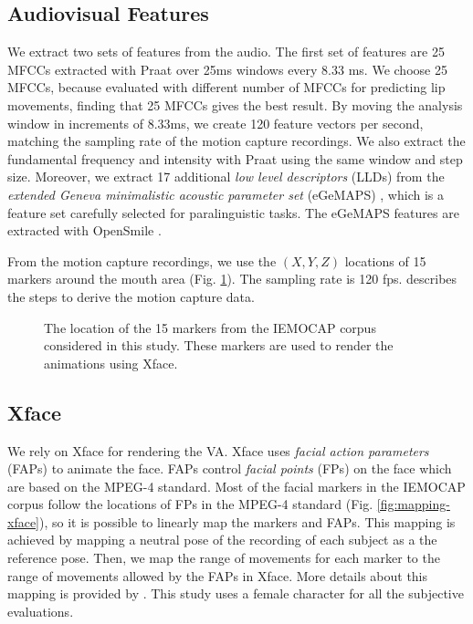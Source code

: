 \documentclass[10pt,journal,compsoc]{IEEEtran}
\begin{document}
\subsection{Audiovisual Features}
\label{ssec:features}

We extract two sets of features from the audio. The first set of features are 25 MFCCs extracted with Praat \cite{Boersma_1996} over 25ms windows every 8.33 ms. We choose 25 MFCCs, because  \citet{Taylor_2016} evaluated with different number of MFCCs for predicting lip movements, finding that 25 MFCCs gives the best result. By moving the analysis window in increments of 8.33ms, we create 120 feature vectors per second, matching the sampling rate of the motion capture recordings. We also extract the fundamental frequency and intensity with Praat using the same window and step size. Moreover, we extract 17 additional \emph{low level descriptors} (LLDs) from the \emph{extended Geneva minimalistic acoustic parameter set} (eGeMAPS) \cite{Eyben_2016}, which is a feature set carefully selected for paralinguistic tasks. The eGeMAPS features are extracted with OpenSmile \cite{Eyben_2010_2}.

From the motion capture recordings, we use the $(X,Y,Z)$ locations of 15 markers around the mouth area (Fig. \ref{fig:IEMOCAP}). The sampling rate is 120 fps.  \citet{Busso_2008_5} describes the steps to derive the motion capture data.  

\begin{figure}[t]
	\centering
	\caption{The location of the 15 markers from the IEMOCAP corpus considered in this study. These markers are used to render the animations using Xface.}
	\label{fig:IEMOCAP}
\end{figure}





\subsection{Xface}
\label{ssec:xface}    
We rely on Xface \cite{Balci_2004} for rendering the VA. Xface uses \emph{facial action parameters} (FAPs) to animate the face. FAPs control  \emph{facial points} (FPs) on the face which are based on the MPEG-4 standard. Most of the facial markers in the IEMOCAP corpus follow the locations of FPs in the MPEG-4 standard (Fig. \ref{fig:mapping-xface}), so it is possible to linearly map the markers and FAPs. This mapping is achieved by mapping a neutral pose of the recording of each subject as a the reference pose. Then, we map the range of movements for each marker to the range of movements allowed by the FAPs in Xface. More details about this mapping is provided by \citet{Mariooryad_2012_2}. This study uses a female character for all the subjective evaluations. 
\end{document}
